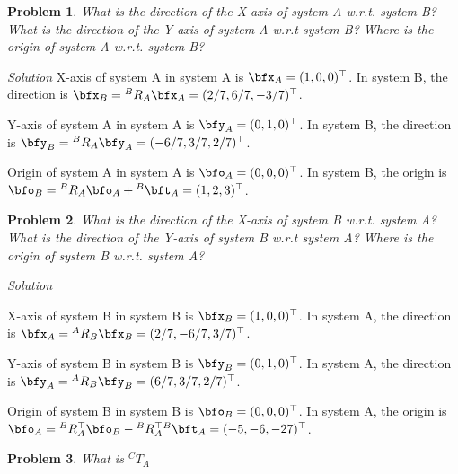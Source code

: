 \documentclass{article}
\newtheorem{prob}{Problem}
\numberwithin{prob}{section}
\newenvironment{solution}{\emph{Solution}}{}
\begin{document}
\begin{prob}
What is the direction of the X-axis of system A w.r.t. system B? What is the direction of the Y-axis of system A w.r.t system B? Where is the origin of system A w.r.t. system B?
\end{prob}
\begin{solution}
X-axis of system A in system A is $\bfx_A = (1, 0, 0)^\top$. In system B, the direction is $\bfx_B = {}^B R_A \bfx_A = (2/7, 6/7, -3/7)^\top$.


Y-axis of system A in system A is $\bfy_A = (0, 1, 0)^\top$. In system B, the direction is $\bfy_B = {}^B R_A \bfy_A = (-6/7, 3/7, 2/7)^\top$.


Origin of system A in system A is $\bfo_A = (0, 0, 0)^\top$. In system B, the origin is $\bfo_B = {}^B R_A \bfo_A + {}^B\bft_A = (1, 2, 3)^\top$.

\end{solution}
\begin{prob}
What is the direction of the X-axis of system B w.r.t. system A? What is the direction of the Y-axis of system B w.r.t system A? Where is the origin of system B w.r.t. system A?
\end{prob}
\begin{solution}

X-axis of system B in system B is $\bfx_B = (1, 0, 0)^\top$. In system A, the direction is $\bfx_A = {}^A R_B \bfx_B = (2/7, -6/7, 3/7)^\top$.


Y-axis of system B in system B is $\bfy_B = (0, 1, 0)^\top$. In system A, the direction is $\bfy_A = {}^A R_B \bfy_B = (6/7, 3/7, 2/7)^\top$.


Origin of system B in system B is $\bfo_B = (0, 0, 0)^\top$. In system A, the origin is $\bfo_A = {}^B R_A^\top \bfo_B - {}^B R_A^\top  {}^B\bft_A = (-5, -6, -27)^\top$.

\end{solution}
\begin{prob}
  What is ${}^CT_A$
\end{prob}
\end{document}
